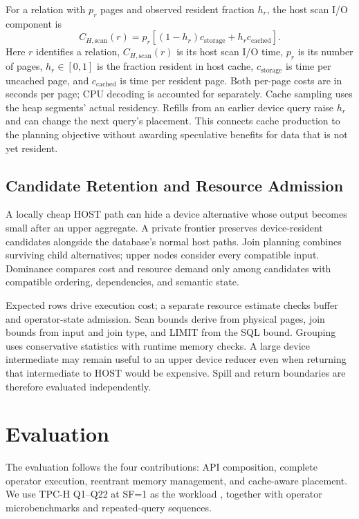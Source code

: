 \documentclass[sigconf, nonacm]{acmart}
\begin{document}
For a relation with $p_r$ pages and observed resident fraction $h_r$, the
host scan I/O component is
\begin{equation}
 C_{H,\mathrm{scan}}(r)=p_r[(1-h_r)c_{\mathrm{storage}}
                                  +h_r c_{\mathrm{cached}}].
\end{equation}
Here $r$ identifies a relation, $C_{H,\mathrm{scan}}(r)$ is its host scan
I/O time, $p_r$ is its number of pages, $h_r\in[0,1]$ is the fraction
resident in host cache, $c_{\mathrm{storage}}$ is time per uncached page,
and $c_{\mathrm{cached}}$ is time per resident page. Both per-page costs
are in seconds per page; CPU decoding is accounted for separately.
Cache sampling uses the heap segments' actual residency. Refills from an
earlier device query raise $h_r$ and can change the next query's placement.
This connects cache production to the planning objective without awarding
speculative benefits for data that is not yet resident.

\subsection{Candidate Retention and Resource Admission}
A locally cheap HOST path can hide a device alternative whose output becomes
small after an upper aggregate. A private frontier preserves device-resident
candidates alongside the database's normal host paths. Join planning combines
surviving child alternatives; upper nodes consider every compatible input.
Dominance compares cost and resource demand only among candidates with
compatible ordering, dependencies, and semantic state.

Expected rows drive execution cost; a separate resource estimate checks
buffer and operator-state admission. Scan bounds derive from physical pages,
join bounds from input and join type, and LIMIT from the SQL bound. Grouping
uses conservative statistics with runtime memory checks. A large device
intermediate may remain useful to an upper device reducer even when returning
that intermediate to HOST would be expensive. Spill and return boundaries
are therefore evaluated independently.

\section{Evaluation}
\label{sec:evaluation}
The evaluation follows the four contributions: API composition, complete
operator execution, reentrant memory management, and cache-aware placement.
We use TPC-H Q1--Q22 at SF=1 as the workload \cite{tpch}, together
with operator microbenchmarks and repeated-query sequences.
\end{document}
